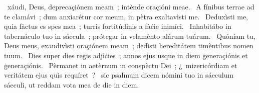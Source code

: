 { }
{%
~xáudi, Deus, deprecaçiónem meam~; intènde oraçióni meae. 
~A fínibus terrae ad te clamávi~; dum anxiarétur cor meum, in pètra exaltavìsti me. 
~Deduxìsti me, quia fàctus es spes mea~; turris fortitúdinis a fàċie inimíci. 
~Inhabitábo in tabernáculo tuo in sáecula~; prótegar in velamènto alárum tuárum. 
~Quóniam tu, Deus meus, exaudivìsti oraçiónem meam~; dedìsti hereditátem timèntibus nomen tuum. 
~Dies super dies reġis adjìċies~; annos ejus usque in diem ġeneraçiónis et ġeneraçiónis. 
~Pèrmanet in aetèrnum in conspèctu Dei~; ¿~mizericórdiam et veritátem ejus quìs requíret~? 
~sic psalmum dicem nómini tuo in sáeculum sáeculi, ut reddam vota mea de die in diem. 
}
